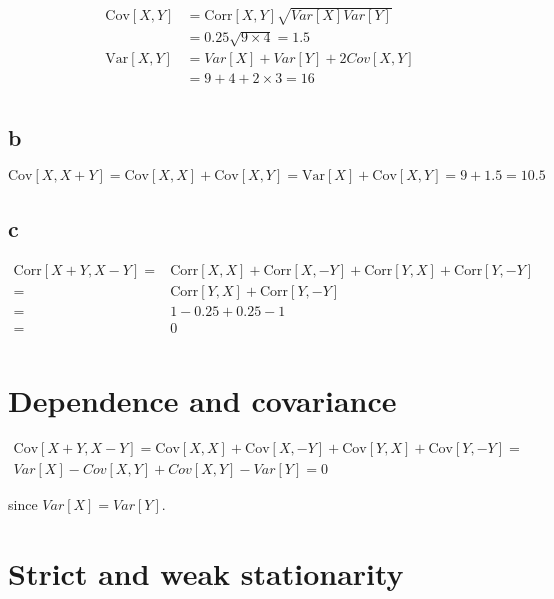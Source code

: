 \documentclass[]{book}
\begin{document}
\begin{align}
    \text{Cov}[X,Y] & = \text{Corr}[X,Y]\sqrt{Var[X]Var[Y]}\\
                    & = 0.25 \sqrt{9 \times 4} = 1.5 \\
    \text{Var}[X,Y] & = Var[X]+Var[Y]+2Cov[X,Y]\\
                    & = 9 + 4 + 2 \times 3 = 16\\
    \end{align}

\subsection*{b}\label{b}

\[\text{Cov}[X, X+Y] = \text{Cov}[X,X] + \text{Cov}[X,Y] =
  \text{Var}[X] + \text{Cov}[X,Y] = 9 + 1.5 = 10.5\]

\subsection*{c}\label{c}

\begin{align}
\text{Corr}[X+Y, X-Y] = & \text{Corr}[X,X] + \text{Corr}[X,-Y] +
                          \text{Corr}[Y,X] + \text{Corr}[Y,-Y] \\
                      = & \text{Corr}[Y,X] + \text{Corr}[Y,-Y] \\
                      = & 1 - 0.25 + 0.25 -1 \\
                      = & 0 \\
\end{align}

\section{Dependence and covariance}\label{dependence-and-covariance}

\begin{gather*}
\text{Cov}[X+Y,X-Y] = \text{Cov}[X,X] + \text{Cov}[X,-Y] +
  \text{Cov}[Y,X] + \text{Cov}[Y, -Y] = \\
Var[X] - Cov[X,Y] + Cov[X,Y] - Var[Y] = 0
\end{gather*}

since \(Var[X] = Var[Y]\).

\section{Strict and weak
stationarity}\label{strict-and-weak-stationarity}
\end{document}
